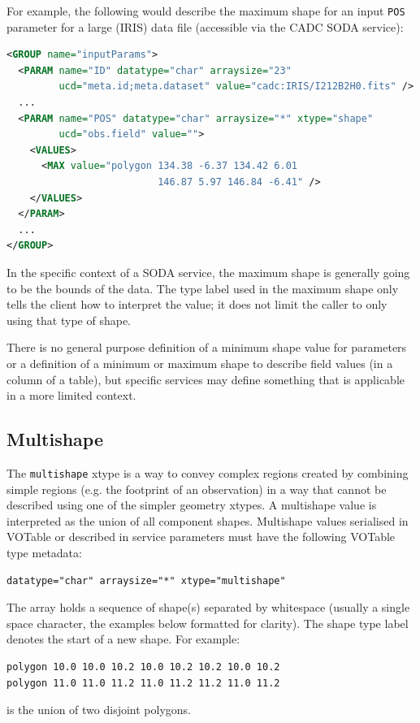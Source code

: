 \documentclass[11pt,letter]{ivoa}
\begin{document}
For example, the following would describe the maximum shape for an input \verb|POS|
parameter for a large (IRIS) data file (accessible via the CADC SODA service):
\begin{lstlisting}[language=XML]
<GROUP name="inputParams">
  <PARAM name="ID" datatype="char" arraysize="23"
         ucd="meta.id;meta.dataset" value="cadc:IRIS/I212B2H0.fits" />
  ...
  <PARAM name="POS" datatype="char" arraysize="*" xtype="shape"
         ucd="obs.field" value="">
    <VALUES>
      <MAX value="polygon 134.38 -6.37 134.42 6.01
                          146.87 5.97 146.84 -6.41" />
    </VALUES>
  </PARAM>
  ...
</GROUP>
\end{lstlisting}

In the specific context of a SODA service, the maximum shape is generally going
to be the bounds of the data. The type label used in the maximum shape only tells
the client how to interpret the value; it does not limit the caller to only using
that type of shape.

There is no general purpose definition of a minimum shape value for parameters or
a definition of a minimum or maximum shape to describe field values (in a column
of a table), but specific services may define something that is applicable in a
more limited context.

\subsection{Multishape}
The \verb|multishape| xtype is a way to convey complex regions created by combining
simple regions (e.g. the footprint of an observation) in a way that cannot be described
using one of the simpler geometry xtypes. A multishape value is interpreted as the union
of all component shapes. Multishape values serialised in VOTable or described in service
parameters must have the following VOTable type metadata:

\begin{verbatim}
datatype="char" arraysize="*" xtype="multishape"
\end{verbatim}

\noindent
The array holds a sequence of shape(s) separated by whitespace (usually a single space
character, the examples below formatted for clarity). The shape type label denotes the
start of a new shape. For example:

\begin{verbatim}
polygon 10.0 10.0 10.2 10.0 10.2 10.2 10.0 10.2
polygon 11.0 11.0 11.2 11.0 11.2 11.2 11.0 11.2
\end{verbatim}
\noindent is the union of two disjoint polygons.
\end{document}

